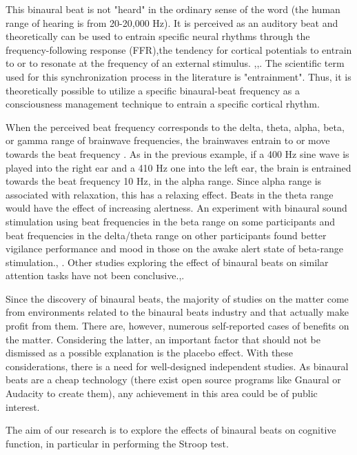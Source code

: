 \documentclass[10pt]{article}
\begin{document}
This binaural beat is not "heard" in the ordinary sense of the word (the human range of hearing is from 20-20,000 Hz). It is perceived as an auditory beat and theoretically can be used to entrain specific neural rhythms through the frequency-following response (FFR),the tendency for cortical potentials to entrain to or to resonate at the frequency of an external stimulus. \cite{smith1975far},\cite{wahbeh2007binaural},\cite{foster1990eeg}. The scientific term used for this synchronization process in the literature is "entrainment". Thus, it is theoretically possible to utilize a specific binaural-beat frequency as a consciousness management technique to entrain a specific cortical rhythm.
 
When the perceived beat frequency corresponds to the delta, theta, alpha, beta, or gamma range of brainwave frequencies, the brainwaves entrain to or move towards the beat frequency \cite{rogers1981methods}. As in the previous example, if a 400 Hz sine wave is played into the right ear and a 410 Hz one into the left ear, the brain is entrained towards the beat frequency 10 Hz, in the alpha range. Since alpha range is associated with relaxation, this has a relaxing effect. Beats in the theta range would have the effect of increasing alertness. An experiment with binaural sound stimulation using beat frequencies in the beta range on some participants and beat frequencies in  the delta/theta range on other participants found better vigilance performance and mood in those on the awake alert state of beta-range stimulation.\cite{owens1998binaural}, \cite{beatty1974operant}. Other studies exploring the effect of binaural beats on similar attention tasks have not been conclusive.\cite{wahbeh2007binaural},\cite{crespo2012effects}.
 
Since the discovery of binaural beats, the majority of studies on the matter come from environments related to the binaural beats industry and that actually make profit from them. There are, however, numerous self-reported cases of benefits on the matter. Considering the latter, an important factor that should not be dismissed as a possible explanation is the placebo effect.  With these considerations, there is a need for well-designed independent studies. As binaural beats are a cheap technology (there exist open source programs like Gnaural or Audacity to create them), any achievement in this area could be of public interest.\cite{crespo2012effects}

The aim of our research is to explore the effects of binaural beats on cognitive function, in particular in performing the Stroop test.
\end{document}
